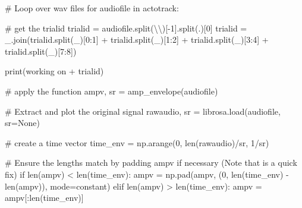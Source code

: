 \documentclass[
  letterpaper,
  DIV=11,
  numbers=noendperiod]{scrreprt}
\newenvironment{Shaded}{\begin{snugshade}}{\end{snugshade}}
\newcommand{\BuiltInTok}[1]{\textcolor[rgb]{0.00,0.23,0.31}{#1}}
\newcommand{\CharTok}[1]{\textcolor[rgb]{0.13,0.47,0.30}{#1}}
\newcommand{\CommentTok}[1]{\textcolor[rgb]{0.37,0.37,0.37}{#1}}
\newcommand{\ControlFlowTok}[1]{\textcolor[rgb]{0.00,0.23,0.31}{#1}}
\newcommand{\DecValTok}[1]{\textcolor[rgb]{0.68,0.00,0.00}{#1}}
\newcommand{\KeywordTok}[1]{\textcolor[rgb]{0.00,0.23,0.31}{#1}}
\newcommand{\NormalTok}[1]{\textcolor[rgb]{0.00,0.23,0.31}{#1}}
\newcommand{\OperatorTok}[1]{\textcolor[rgb]{0.37,0.37,0.37}{#1}}
\newcommand{\StringTok}[1]{\textcolor[rgb]{0.13,0.47,0.30}{#1}}
\newcommand{\VariableTok}[1]{\textcolor[rgb]{0.07,0.07,0.07}{#1}}
\begin{document}
\begin{Shaded}
\begin{Highlighting}[]
\CommentTok{\# Loop over wav files}
\ControlFlowTok{for}\NormalTok{ audiofile }\KeywordTok{in}\NormalTok{ actotrack:}

    \CommentTok{\# get the trialid}
\NormalTok{    trialid }\OperatorTok{=}\NormalTok{ audiofile.split(}\StringTok{\textquotesingle{}}\CharTok{\textbackslash{}\textbackslash{}}\StringTok{\textquotesingle{}}\NormalTok{)[}\OperatorTok{{-}}\DecValTok{1}\NormalTok{].split(}\StringTok{\textquotesingle{}.\textquotesingle{}}\NormalTok{)[}\DecValTok{0}\NormalTok{]}
\NormalTok{    trialid }\OperatorTok{=} \StringTok{\textquotesingle{}\_\textquotesingle{}}\NormalTok{.join(trialid.split(}\StringTok{\textquotesingle{}\_\textquotesingle{}}\NormalTok{)[}\DecValTok{0}\NormalTok{:}\DecValTok{1}\NormalTok{] }\OperatorTok{+}\NormalTok{ trialid.split(}\StringTok{\textquotesingle{}\_\textquotesingle{}}\NormalTok{)[}\DecValTok{1}\NormalTok{:}\DecValTok{2}\NormalTok{] }\OperatorTok{+}\NormalTok{ trialid.split(}\StringTok{\textquotesingle{}\_\textquotesingle{}}\NormalTok{)[}\DecValTok{3}\NormalTok{:}\DecValTok{4}\NormalTok{] }\OperatorTok{+}\NormalTok{ trialid.split(}\StringTok{\textquotesingle{}\_\textquotesingle{}}\NormalTok{)[}\DecValTok{7}\NormalTok{:}\DecValTok{8}\NormalTok{])}

    \BuiltInTok{print}\NormalTok{(}\StringTok{\textquotesingle{}working on \textquotesingle{}} \OperatorTok{+}\NormalTok{ trialid)}

    \CommentTok{\# apply the function}
\NormalTok{    ampv, sr }\OperatorTok{=}\NormalTok{ amp\_envelope(audiofile)}

    \CommentTok{\# Extract and plot the original signal}
\NormalTok{    rawaudio, sr }\OperatorTok{=}\NormalTok{ librosa.load(audiofile, sr}\OperatorTok{=}\VariableTok{None}\NormalTok{)}

    \CommentTok{\# create a time vector}
\NormalTok{    time\_env }\OperatorTok{=}\NormalTok{ np.arange(}\DecValTok{0}\NormalTok{, }\BuiltInTok{len}\NormalTok{(rawaudio)}\OperatorTok{/}\NormalTok{sr, }\DecValTok{1}\OperatorTok{/}\NormalTok{sr)}
    
    \CommentTok{\# Ensure the lengths match by padding ampv if necessary (Note that is a quick fix)}
    \ControlFlowTok{if} \BuiltInTok{len}\NormalTok{(ampv) }\OperatorTok{\textless{}} \BuiltInTok{len}\NormalTok{(time\_env):}
\NormalTok{        ampv }\OperatorTok{=}\NormalTok{ np.pad(ampv, (}\DecValTok{0}\NormalTok{, }\BuiltInTok{len}\NormalTok{(time\_env) }\OperatorTok{{-}} \BuiltInTok{len}\NormalTok{(ampv)), mode}\OperatorTok{=}\StringTok{\textquotesingle{}constant\textquotesingle{}}\NormalTok{)}
    \ControlFlowTok{elif} \BuiltInTok{len}\NormalTok{(ampv) }\OperatorTok{\textgreater{}} \BuiltInTok{len}\NormalTok{(time\_env):}
\NormalTok{        ampv }\OperatorTok{=}\NormalTok{ ampv[:}\BuiltInTok{len}\NormalTok{(time\_env)]}


\end{Highlighting}
\end{Shaded}
\end{document}
